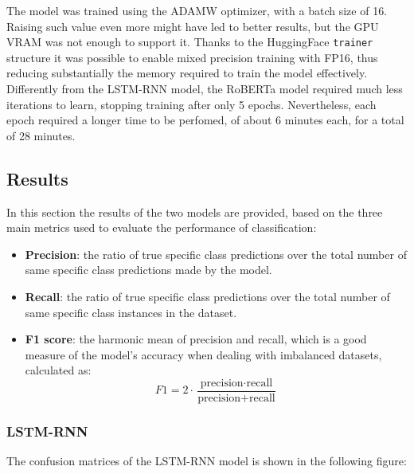             The model was trained using the ADAMW optimizer, with a batch size of 16. Raising such
            value even more might have led to better results, but the GPU VRAM was not enough to
            support it. Thanks to the HuggingFace \texttt{trainer} structure it was possible
            to enable mixed precision training with FP16, thus reducing substantially the memory
            required to train the model effectively. \\

            Differently from the LSTM-RNN model, the RoBERTa model required much less iterations
            to learn, stopping training after only 5 epochs. Nevertheless, each epoch required
            a longer time to be perfomed, of about 6 minutes each, for a total of 28 minutes. \\



    \subsection{Results} 
    \label{sec:results}
        In this section the results of the two models are provided, based on the three 
        main metrics used to evaluate the performance of classification:
        \begin{itemize}
            \item \textbf{Precision}: the ratio of true specific class predictions over the 
                            total number of same specific class predictions made by the model.
            \item \textbf{Recall}: the ratio of true specific class predictions over the total 
                            number of same specific class instances in the dataset.
            \item \textbf{F1 score}: the harmonic mean of precision and recall, which is a good
                            measure of the model's accuracy when dealing with imbalanced datasets,
                            calculated as:
                        \[F1 = 2 \cdot \frac{\text{precision} \cdot \text{recall}}{\text{precision} + \text{recall}}\]
        \end{itemize}

        \subsubsection{LSTM-RNN}
        \label{subsec:lstm_results}
            The confusion matrices of the LSTM-RNN model is shown in the following figure:

